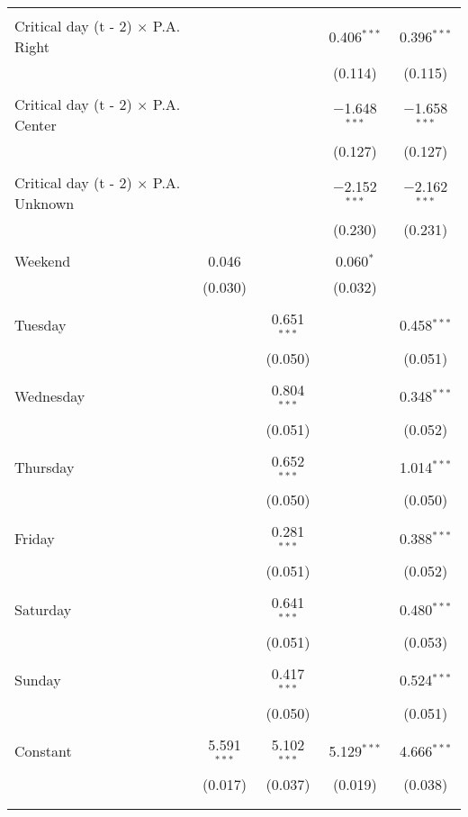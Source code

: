 \documentclass[
]{article}
\begin{document}
\begin{table}[!htbp]
{\begin{tabular}{@{\extracolsep{5pt}}lcccc}
  & & & & \\ 
 Critical day (t - 2) $\times$ P.A. Right &  &  & 0.406$^{***}$ & 0.396$^{***}$ \\ 
  &  &  & (0.114) & (0.115) \\ 
  & & & & \\ 
 Critical day (t - 2) $\times$ P.A. Center &  &  & $-$1.648$^{***}$ & $-$1.658$^{***}$ \\ 
  &  &  & (0.127) & (0.127) \\ 
  & & & & \\ 
 Critical day (t - 2) $\times$ P.A. Unknown &  &  & $-$2.152$^{***}$ & $-$2.162$^{***}$ \\ 
  &  &  & (0.230) & (0.231) \\ 
  & & & & \\ 
 Weekend & 0.046 &  & 0.060$^{*}$ &  \\ 
  & (0.030) &  & (0.032) &  \\ 
  & & & & \\ 
 Tuesday &  & 0.651$^{***}$ &  & 0.458$^{***}$ \\ 
  &  & (0.050) &  & (0.051) \\ 
  & & & & \\ 
 Wednesday &  & 0.804$^{***}$ &  & 0.348$^{***}$ \\ 
  &  & (0.051) &  & (0.052) \\ 
  & & & & \\ 
 Thursday &  & 0.652$^{***}$ &  & 1.014$^{***}$ \\ 
  &  & (0.050) &  & (0.050) \\ 
  & & & & \\ 
 Friday &  & 0.281$^{***}$ &  & 0.388$^{***}$ \\ 
  &  & (0.051) &  & (0.052) \\ 
  & & & & \\ 
 Saturday &  & 0.641$^{***}$ &  & 0.480$^{***}$ \\ 
  &  & (0.051) &  & (0.053) \\ 
  & & & & \\ 
 Sunday &  & 0.417$^{***}$ &  & 0.524$^{***}$ \\ 
  &  & (0.050) &  & (0.051) \\ 
  & & & & \\ 
 Constant & 5.591$^{***}$ & 5.102$^{***}$ & 5.129$^{***}$ & 4.666$^{***}$ \\ 
  & (0.017) & (0.037) & (0.019) & (0.038) \\ 
  & & & & \\ 
\hline \\[-1.8ex] 

\end{tabular}}
\end{table}
\end{document}

